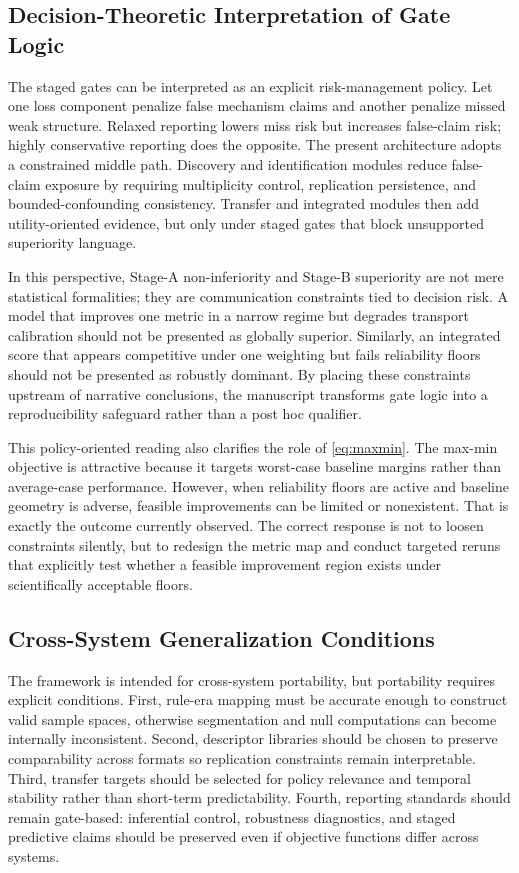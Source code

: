 \documentclass{article} %
\begin{document}
\subsection{Decision-Theoretic Interpretation of Gate Logic}
The staged gates can be interpreted as an explicit risk-management policy. Let one loss component penalize false mechanism claims and another penalize missed weak structure. Relaxed reporting lowers miss risk but increases false-claim risk; highly conservative reporting does the opposite. The present architecture adopts a constrained middle path. Discovery and identification modules reduce false-claim exposure by requiring multiplicity control, replication persistence, and bounded-confounding consistency. Transfer and integrated modules then add utility-oriented evidence, but only under staged gates that block unsupported superiority language.

In this perspective, Stage-A non-inferiority and Stage-B superiority are not mere statistical formalities; they are communication constraints tied to decision risk. A model that improves one metric in a narrow regime but degrades transport calibration should not be presented as globally superior. Similarly, an integrated score that appears competitive under one weighting but fails reliability floors should not be presented as robustly dominant. By placing these constraints upstream of narrative conclusions, the manuscript transforms gate logic into a reproducibility safeguard rather than a post hoc qualifier.

This policy-oriented reading also clarifies the role of \eqref{eq:maxmin}. The max-min objective is attractive because it targets worst-case baseline margins rather than average-case performance. However, when reliability floors are active and baseline geometry is adverse, feasible improvements can be limited or nonexistent. That is exactly the outcome currently observed. The correct response is not to loosen constraints silently, but to redesign the metric map and conduct targeted reruns that explicitly test whether a feasible improvement region exists under scientifically acceptable floors.

\subsection{Cross-System Generalization Conditions}
The framework is intended for cross-system portability, but portability requires explicit conditions. First, rule-era mapping must be accurate enough to construct valid sample spaces, otherwise segmentation and null computations can become internally inconsistent. Second, descriptor libraries should be chosen to preserve comparability across formats so replication constraints remain interpretable. Third, transfer targets should be selected for policy relevance and temporal stability rather than short-term predictability. Fourth, reporting standards should remain gate-based: inferential control, robustness diagnostics, and staged predictive claims should be preserved even if objective functions differ across systems.
\end{document}
